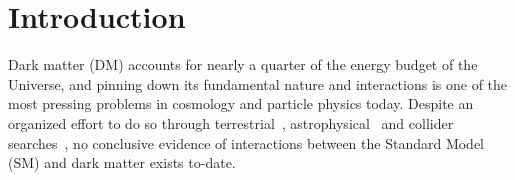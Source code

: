 \documentclass[twocolumn]{aastex63}
\newcommand{\Gaia}{\emph{Gaia}}
\begin{document}




\section{Introduction}

Dark matter (DM) accounts for nearly a quarter of the energy budget of the Universe, and pinning down its fundamental nature and interactions is one of the most pressing problems in cosmology and particle physics today. Despite an organized effort to do so through terrestrial~\cite{2018PhRvL.121k1302A,2017PhRvL.119r1302C,2017PhRvL.118b1303A}, astrophysical~\cite{2017ApJ...834..110A,2018PhRvD..98l3004C,2018PhRvL.120j1101L} and collider searches~\cite{2019arXiv190301400A,2017PhLB..769..520S}, no conclusive evidence of interactions between the Standard Model (SM) and dark matter exists to-date.
\end{document}
